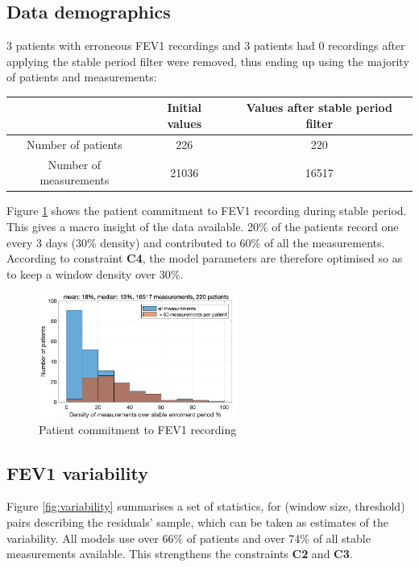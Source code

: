 \subsection{Data demographics}
3 patients with erroneous FEV1 recordings and 3 patients had 0 recordings after applying the stable period filter were removed, thus ending up using the majority of patients and measurements:

\vspace{0.4cm}
\begin{tabular}{c|c|c}
     & \textbf{Initial values} & \textbf{Values after stable period filter} \\
     \hline
    Number of patients & 226 & 220\\
    Number of measurements & 21036 & 16517 \\

\end{tabular} \vspace{0.4cm}

Figure \ref{fig:commitment} shows the patient commitment to FEV1 recording during stable period. This gives a macro insight of the data available. 20\% of the patients record one every 3 days (30\% density) and contributed to 60\% of all the measurements. According to constraint \textbf{C4}, the model parameters are therefore optimised so as to keep a window density over 30\%.

\begin{figure}[!h]
    \centering
    \includegraphics[width=65mm]{images/patientCommitmentFEV1stable.png}
    \caption{Patient commitment to FEV1 recording}
    \label{fig:commitment}
\end{figure}

\subsection{FEV1 variability}
Figure \ref{fig:variability} summarises a set of statistics, for (window size, threshold) pairs describing the residuals' sample, which can be taken as estimates of the variability. All models use over 66\% of patients and over 74\% of all stable measurements available. This strengthens the constraints \textbf{C2} and \textbf{C3}. 

